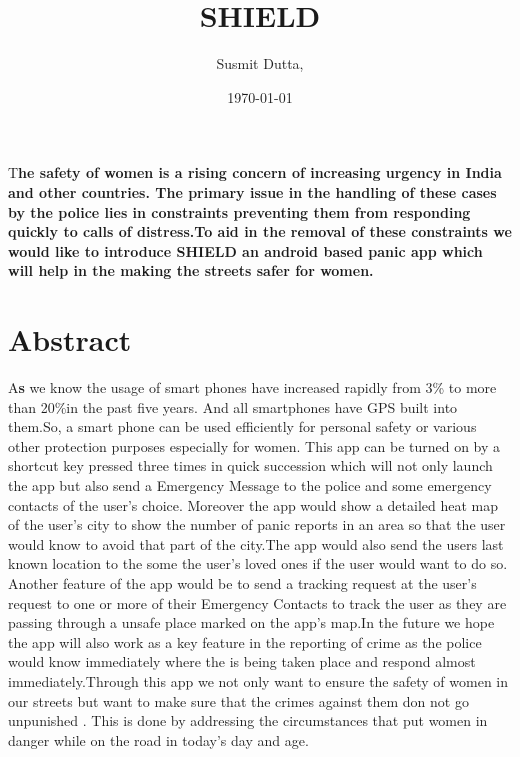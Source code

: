 \documentclass[	DIV=calc,%
							paper=a4,%
							fontsize=12pt,%
							twocolumn]{scrartcl}
\title{ SHIELD}					%
\author{Susmit Dutta, }											%
\date{\today}																				%
\newcommand{\initial}[1]{%
     \lettrine[lines=3,lhang=0.3,nindent=0em]{
     				\color{DarkGoldenrod}
     				{\textsf{#1}}}{}}
\begin{document}
\setmainfont{Times New Roman}
\maketitle
\thispagestyle{fancy} 			%
\initial{T}\textbf{he safety of women is a rising concern of increasing urgency in India and other countries. The primary issue in the handling of these cases by the police lies in constraints preventing them from responding quickly to calls of distress.To aid in the removal of these constraints we would like to introduce SHIELD an android based panic app which will help in the making the streets safer for women.}

\section*{Abstract}
\initial{A}\textbf{s} we know the usage of smart phones have increased rapidly from 3\% to more than 20\%in the past five years. And all smartphones have GPS built into them.So, a smart phone can be used efficiently for personal safety or various other protection purposes especially for women. This app can be turned on by a shortcut key pressed three times in quick succession which will not only launch the app but also send a Emergency Message to the police and some emergency contacts of the user's choice. Moreover the app would show a detailed heat map of the user's city to show the number of panic reports in an area so that the user would know to avoid that part of the city.The app would also send the users last known location to the some the user's loved ones if the user would want to do so. Another feature of the app would be to send a tracking request at the user's request to one or more of their Emergency Contacts to track the user as they are passing through a unsafe place marked on the app's map.In the future we hope the app will also work as a key feature in the reporting of crime as the police would know immediately where the is being taken place and respond almost immediately.Through this app we not only want to ensure the safety of women in our streets but want to make sure that the crimes against them don not go unpunished . This is done by addressing the circumstances that put women in danger while on the road in today's day and age.
\end{document}
